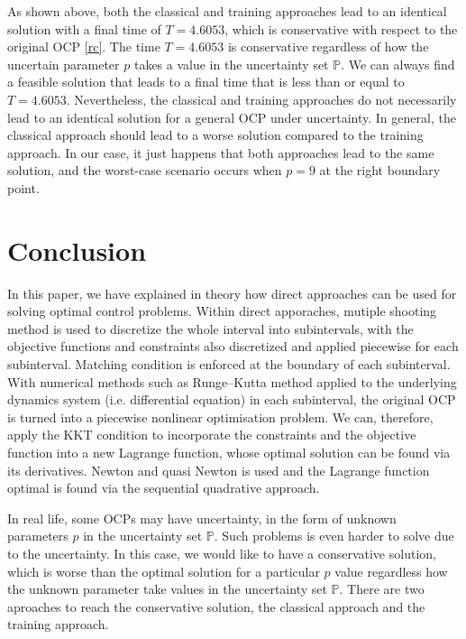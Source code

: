 \documentclass  [
  paper    = a4,
  BCOR     = 10mm,
  twoside,
  fontsize = 12pt,
  fleqn,
  toc      = bibnumbered,
  toc      = listofnumbered,
  numbers  = noendperiod,
  headings = normal,
  listof   = leveldown,
  version  = 3.03
]                                       {scrreprt}
\newcommand{\<}{\langle}
\renewcommand{\>}{\rangle}
\begin{document}
As shown above, both the classical and training approaches lead to an identical solution with a final time of $T=4.6053$, which is conservative with respect to the original OCP \ref{rc}. The time $T=4.6053$ is conservative regardless of how the uncertain parameter $p$ takes a value in the uncertainty set $\mathbb{P}$. We can always find a feasible solution that leads to a final time that is less than or equal to $T=4.6053$. Nevertheless, the classical and training approaches do not necessarily lead to an identical solution for a general OCP under uncertainty. In general, the classical approach should lead to a worse solution compared to the training approach. In our case, it just happens that both approaches lead to the same solution, and the worst-case scenario occurs when $p=9$ at the right boundary point.




\chapter{Conclusion}
\label{Chapter5}
In this paper, we have explained in theory how direct approaches can be used for solving optimal control problems. Within direct apporaches, mutiple shooting method is used to discretize the whole interval into subintervals, with the objective functions and constraints also discretized and applied piecewise for each subinterval. Matching condition is enforced at the boundary of each subinterval. With numerical methods such as Runge–Kutta method applied to the underlying dynamics system (i.e. differential equation) in each subinterval, the original OCP is turned into a piecewise nonlinear optimisation problem. We can, therefore, apply the KKT condition to incorporate the constraints and the objective function into a new Lagrange function, whose optimal solution can be found via its derivatives. Newton and quasi Newton is used and the Lagrange function optimal is found via the sequential quadrative approach. 

In real life, some OCPs may have uncertainty, in the form of unknown parameters $p$ in the uncertainty set  $\mathbb{P}$. Such problems is even harder to solve due to the uncertainty. In this case, we would like to have a conservative solution, which is worse than the optimal solution for a particular $p$ value regardless how the unknown parameter take values in the uncertainty set $\mathbb{P}$. There are two aproaches to reach the conservative solution, the classical approach and the training approach. 
\end{document}
